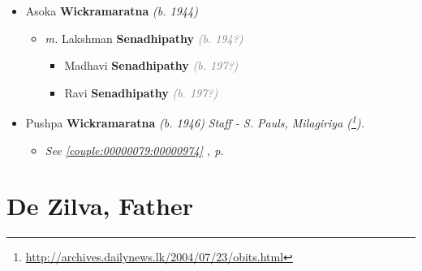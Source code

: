 \documentclass[10pt, openany]{book}
\begin{document}
\begin{itemize}
{\begin{itemize}
{\begin{itemize}
{\begin{itemize}
{ }
\item{Hirushi \textbf{Wickramaratna} \textcolor{gray}{\textit{(b. 197?)}}
 }
\item{Dhanushka \textbf{Wickramaratna} \textcolor{gray}{\textit{(b. 197?)}}
 }
\end{itemize}}
\end{itemize}
 }
\item{Asoka \textbf{Wickramaratna} \textcolor{slorange}{\textit{(b. 1944)}}
\begin{itemize}
\item{\textit{m.} Lakshman \textbf{Senadhipathy} \textcolor{gray}{\textit{(b. 194?)}}   \label{couple:00000699:00000965} \begin{itemize}
\item{Madhavi \textbf{Senadhipathy} \textcolor{gray}{\textit{(b. 197?)}}
 }
\item{Ravi \textbf{Senadhipathy} \textcolor{gray}{\textit{(b. 197?)}}
 }
\end{itemize}}
\end{itemize}
 }
\item{Pushpa \textbf{Wickramaratna} \textcolor{slorange}{\textit{(b. 1946)}} \textcolor{slmaroon}{\textit{Staff - S. Pauls, Milagiriya (\footnote{\url{http://archives.dailynews.lk/2004/07/23/obits.html}}).}}
\begin{itemize}
\item{\textcolor{slteal}{\textit{See  \autoref{couple:00000079:00000974} \textit{, p. \pageref{couple:00000079:00000974} }}}}
\end{itemize}
 }
\end{itemize}}
\end{itemize}
 
\part{De Zilva, Father}
\end{document}
